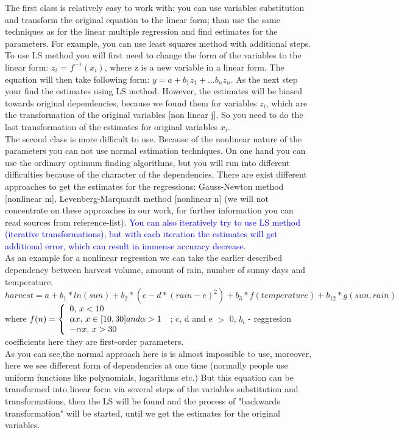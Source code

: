 \documentclass {article}
\begin{document}
The first class is relatively easy to work with: you can use variables substitution and transform the original equation to the linear form; than use the same techniques as for the linear multiple regression and find estimates for the parameters. For example, you can use least squares method with additional steps. To use LS method you will first need to change the form of the variables to the linear form: $z_{i}$ = $f^{-1}(x_{i})$, where z is a new variable in a linear form. The equation will then take following form: $y=a+b_{1}z_{1}+...b_{n}z_{n}$. As the next step your find the estimates using LS method. However, the estimates will be biased towards original dependencies, because we found them for variables $z_{i}$, which are the transformation of the original variables [non linear j]. So you need to do the last transformation of the estimates for original variables $x_{i}$.\\
The second class is more difficult to use. Because of the nonlinear nature of the parameters you can not use normal estimation techniques. On one hand you can use the ordinary optimum finding algorithms, but you will run into different difficulties because of the character of the dependencies. There are exist different approaches to get the estimates for the regressions: Gauss-Newton method [nonlinear m],  Levenberg-Marquardt method [nonlinear n] (we will not concentrate on these approaches in our work, for further information you can read sources from reference-list). \textcolor{blue}{You can also iteratively try to use LS method (iterative transformations), but with each iteration the estimates will get additional error, which can result in immense accuracy decrease}. \\
As an example for a nonlinear regression we can take the earlier described dependency between harvest volume, amount of rain, number of sunny days and temperature.
\[harvest = a + b_{1}*ln(sun) + b_{2}*(c-d*(rain-e)^2) +b_{3}*f(temperature) + b_{12}*g(sun, rain)\]
where $f(n) = \left\{ 
  \begin{array}{l l}
  	0,\thinspace x < 10 \\
    \alpha x, \thinspace x \in [10, 30] and \alpha > 1 \\
    -\alpha x,\thinspace x > 30
  \end{array} \right.$ ; c, d and e $>$ 0, $b_{i}$ - reggresion coefficients here they are first-order parameters. \\
As you can see,the normal approach here is is almost impossible to use, moreover, here we see different form of dependencies at one time (normally people use uniform functions like polynomials, logarithms etc.) But this equation can be transformed into linear form via several steps of the variables substitution and transformations, then the LS will be found and the process of "backwards transformation" will be started, until we get the estimates for the original variables.
\end{document}
